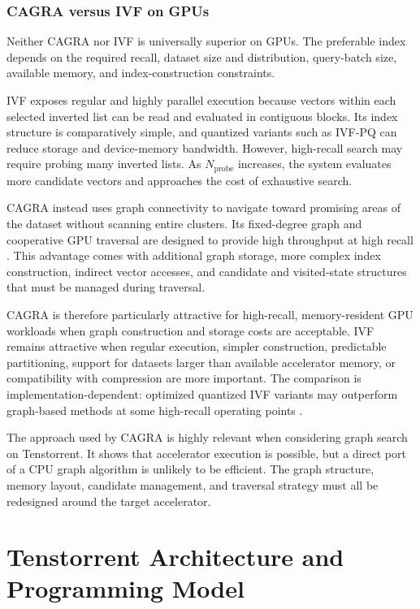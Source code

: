 \subsubsection*{CAGRA versus IVF on GPUs}

Neither CAGRA nor IVF is universally superior on GPUs. The preferable index depends on the required recall, dataset size and distribution, query-batch size, available memory, and index-construction constraints.

IVF exposes regular and highly parallel execution because vectors within each selected inverted list can be read and evaluated in contiguous blocks. Its index structure is comparatively simple, and quantized variants such as IVF-PQ can reduce storage and device-memory bandwidth. However, high-recall search may require probing many inverted lists. As \(N_{\mathrm{probe}}\) increases, the system evaluates more candidate vectors and approaches the cost of exhaustive search.

CAGRA instead uses graph connectivity to navigate toward promising areas of the dataset without scanning entire clusters. Its fixed-degree graph and cooperative GPU traversal are designed to provide high throughput at high recall \cite{cagra}. This advantage comes with additional graph storage, more complex index construction, indirect vector accesses, and candidate and visited-state structures that must be managed during traversal.

CAGRA is therefore particularly attractive for high-recall, memory-resident GPU workloads when graph construction and storage costs are acceptable. IVF remains attractive when regular execution, simpler construction, predictable partitioning, support for datasets larger than available accelerator memory, or compatibility with compression are more important. The comparison is implementation-dependent: optimized quantized IVF variants may outperform graph-based methods at some high-recall operating points \cite{ivf_rabitq_gpu}.

The approach used by CAGRA is highly relevant when considering graph search on Tenstorrent. It shows that accelerator execution is possible, but a direct port of a CPU graph algorithm is unlikely to be efficient. The graph structure, memory layout, candidate management, and traversal strategy must all be redesigned around the target accelerator.

\section{Tenstorrent Architecture and Programming Model}
\label{sec:tt-architecture}

